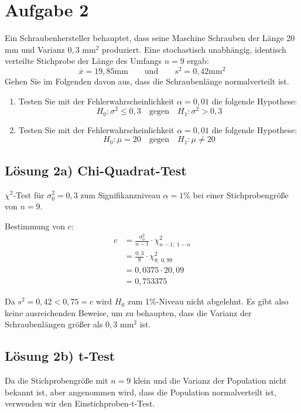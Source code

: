 \documentclass[main.tex]{subfiles}
\begin{document}
\section{Aufgabe 2}
Ein Schraubenhersteller behauptet, dass seine Maschine Schrauben der Länge 20 mm und Varianz $0,3$ mm$^2$ produziert. Eine stochastisch unabhängig, identisch verteilte Stichprobe der Länge des Umfangs $n=9$ ergab:
$$
\overline{x} = 19,85 \text{mm}
\qquad \text{und} \qquad
s^2 = 0,42 \text{mm}^2
$$
Gehen Sie im Folgenden davon aus, dass die Schraubenlänge normalverteilt ist.
\begin{enumerate}
\item Testen Sie mit der Fehlerwahrscheinlichkeit $\alpha = 0,01$ die folgende Hypothese:
$$ H_0: \sigma^2 \leq 0,3 \quad \mbox{gegen} \quad H_1: \sigma^2 > 0,3 $$
\item Testen Sie mit der Fehlerwahrscheinlichkeit $\alpha = 0,01$ die folgende Hypothese:
$$ H_0: \mu = 20 \quad \mbox{gegen} \quad H_1: \mu \neq 20 $$
\end{enumerate}

\subsection{Lösung 2a) Chi-Quadrat-Test}
$\chi^2$-Test für $\sigma_0^2 = 0,3$ zum Signifikanzniveau $\alpha = 1\%$ bei einer Stichprobengröße von $n=9$.

Bestimmung von $c$:
$$\begin{aligned}
    c &= \frac{\sigma_0^2}{n-1} \cdot \chi^2_{n-1;\ 1-\alpha} \\
    &= \frac{0,3}{8} \cdot \chi^2_{8;\ 0,99} \\
    &= 0,0375 \cdot 20,09 \\
    &= 0,753375
\end{aligned}$$

Da $s^2 = 0,42 < 0,75 = c$ wird $H_0$ zum 1\%-Niveau nicht abgelehnt. Es gibt also keine ausreichenden Beweise, um zu behaupten, dass die Varianz der Schraubenlängen größer als $0,3$ mm$^2$ ist.


\subsection{Lösung 2b) t-Test}
Da die Stichprobengröße mit $n = 9$ klein und die Varianz der Population nicht bekannt ist, aber angenommen wird, dass die Population normalverteilt ist, verwenden wir den Einstichproben-t-Test.\\
\end{document}

